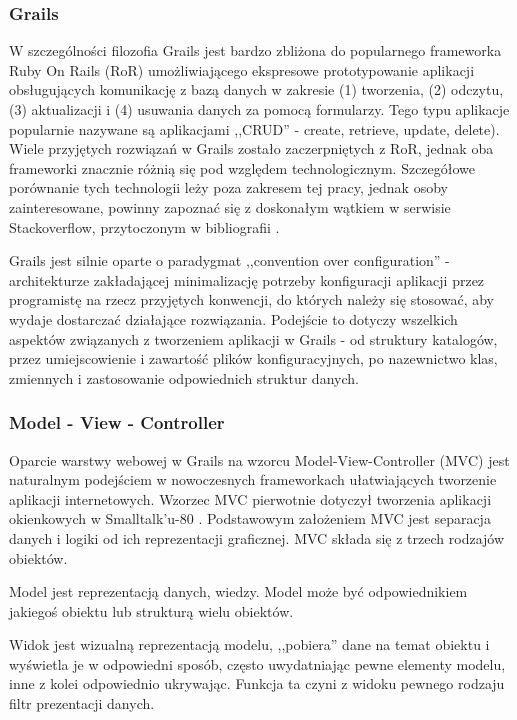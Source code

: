     \subsubsection{Grails}

    W szczególności filozofia Grails jest bardzo zbliżona do popularnego frameworka Ruby On Rails (RoR) umożliwiającego ekspresowe prototypowanie aplikacji obsługujących komunikację z bazą danych w zakresie (1) tworzenia, (2) odczytu, (3) aktualizacji i (4) usuwania danych za pomocą formularzy. Tego typu aplikacje popularnie nazywane są aplikacjami ,,CRUD'' - create, retrieve, update, delete). Wiele przyjętych rozwiązań w Grails zostało zaczerpniętych z RoR, jednak oba frameworki znacznie różnią się pod względem technologicznym. Szczegółowe porównanie tych technologii leży poza zakresem tej pracy, jednak osoby zainteresowane, powinny zapoznać się z doskonałym wątkiem w serwisie Stackoverflow, przytoczonym w bibliografii \cite{RailsGr}.

    Grails jest silnie oparte o paradygmat ,,convention over configuration'' - architekturze zakładającej minimalizację potrzeby konfiguracji aplikacji przez programistę na rzecz przyjętych konwencji, do których należy się stosować, aby wydaje dostarczać działające rozwiązania. Podejście to dotyczy wszelkich aspektów związanych z tworzeniem aplikacji w Grails - od struktury katalogów, przez umiejscowienie i zawartość plików konfiguracyjnych, po nazewnictwo klas, zmiennych i zastosowanie odpowiednich struktur danych. 

    \subsubsection{Model - View - Controller}

    Oparcie warstwy webowej w Grails na wzorcu Model-View-Controller (MVC) jest naturalnym podejściem w nowoczesnych frameworkach ułatwiających tworzenie aplikacji internetowych. Wzorzec MVC \cite{GoF} pierwotnie dotyczył tworzenia aplikacji okienkowych w Smalltalk'u-80 \cite{coad93}. Podstawowym założeniem MVC jest separacja danych i logiki od ich reprezentacji graficznej. MVC składa się z trzech rodzajów obiektów. 
  
    Model jest reprezentacją danych, wiedzy. Model może być odpowiednikiem jakiegoś obiektu lub strukturą wielu obiektów. 

    Widok jest wizualną reprezentacją modelu, ,,pobiera'' dane na temat obiektu i wyświetla je w odpowiedni sposób, często uwydatniając pewne elementy modelu, inne z kolei odpowiednio ukrywając. Funkcja ta czyni z widoku pewnego rodzaju filtr prezentacji danych. 

